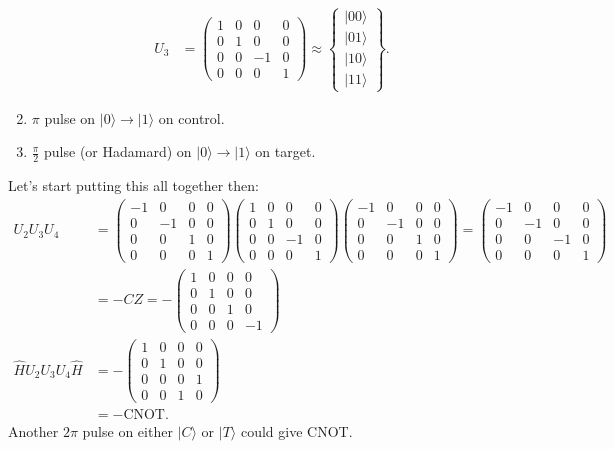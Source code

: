 \documentclass[a4paper, 11pt, normalem]{report}
\begin{document}
\begin{enumerate}
        \begin{align}
            U_3 &= \begin{pmatrix} 1 & 0 & 0 & 0 \\ 0 & 1 & 0 & 0 \\ 0 & 0 & -1 & 0 \\ 0 & 0 & 0 & 1 \end{pmatrix} \approx \begin{Bmatrix} |00\rangle \\ |01\rangle \\ |10\rangle \\ |11\rangle\end{Bmatrix}.
        \end{align}
    \item $\pi$ pulse on $|0\rangle\to|1\rangle$ on control.
    \item $\frac{\pi}{2}$ pulse (or Hadamard) on $|0\rangle\to|1\rangle$ on target.
\end{enumerate}
Let's start putting this all together then:
\begin{align}
    U_2U_3U_4 &= \begin{pmatrix} -1 & 0 & 0 & 0 \\ 0 & -1 & 0 & 0 \\ 0 & 0 & 1 & 0 \\ 0 & 0 & 0 & 1 \end{pmatrix} \begin{pmatrix} 1 & 0 & 0 & 0 \\ 0 & 1 & 0 & 0 \\ 0 & 0 & -1 & 0 \\ 0 & 0 & 0 & 1\end{pmatrix} \begin{pmatrix} -1 & 0 & 0 & 0 \\ 0 & -1 & 0 & 0 \\ 0 & 0 & 1 & 0 \\ 0 & 0 & 0 & 1 \end{pmatrix} = \begin{pmatrix} -1 & 0 & 0 & 0 \\ 0 & -1 & 0 & 0 \\ 0 & 0 & -1 & 0 \\ 0 & 0 & 0 & 1 \end{pmatrix} \\
              &= -CZ = -\begin{pmatrix} 1 & 0 & 0 & 0 \\ 0 & 1 & 0 & 0 \\ 0 & 0 & 1 & 0 \\ 0 & 0 & 0 & -1 \end{pmatrix} \\
    \hat{H}U_2U_3U_4\hat{H} &= -\begin{pmatrix} 1 & 0 & 0 & 0 \\ 0 & 1 & 0 & 0 \\ 0 & 0 & 0 & 1 \\ 0 & 0 & 1 & 0 \end{pmatrix} \\
                            &= -\text{CNOT}.
\end{align}
Another $2\pi$ pulse on either $|C\rangle$ or $|T\rangle$ could give CNOT.
\end{document}
